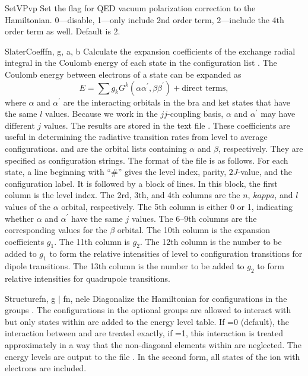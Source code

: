 \begin{fundesc}{SetVP}{vp}
Set the flag for QED vacuum polarization correction to the Hamiltonian.
0---disable, 1---only include 2nd order term, 2---include the 4th order term as
well. Default is 2.
\end{fundesc}

\begin{fundesc}{SlaterCoeff}{fn, g, a, b}
Calculate the expansion coefficients of the exchange radial integral in the
Coulomb energy of each state in the configuration list  . The Coulomb
energy between electrons of a state can be expanded as
\begin{equation}
E = \sum g_kG^k(\alpha\alpha^\prime,\beta\beta^\prime) + \mbox{direct terms},
\end{equation}
where $\alpha$ and $\alpha^\prime$ are the interacting orbitals in the bra and
ket states that have the same $l$ values. Because we work in the $jj$-coupling
basis, $\alpha$ and $\alpha^\prime$ may have different $j$ values. The results
are stored in the text file . These coefficients are useful in
determining the radiative transition rates from level to average configurations.
 and  are the orbital lists containing $\alpha$ and $\beta$,
respectively. They are specified as configuration strings. The format of the
file is as follows. For each state, a line beginning with ``\#'' gives the level
index, parity, $2J$-value, and the configuration label. It is followed by a
block of lines. In this block, the first column is the level index. The 2rd,
3th, and 4th columns are the $n$, $kappa$, and $l$ values of the $\alpha$
orbital, respectively. The 5th column is either 0 or 1, indicating whether
$\alpha$ and $\alpha^\prime$ have the same $j$ values. The 6--9th  columns are
the corresponding values for the $\beta$ orbital. The 10th column is the
expansion coefficients $g_1$. The 11th column is $g_2$. The 12th column is the
number to be added to $g_1$ to form the relative intensities of level to
configuration transitions for dipole transitions. The 13th column is the number
to be added to $g_2$ to form relative intensities for quadrupole transitions.
\end{fundesc}

\begin{fundesc}{Structure}{fn, g $\mid$ fn, nele}
Diagonalize the Hamiltonian for configurations in the groups . The
configurations in the optional groups  are allowed to interact with
 but only states within  are added to the energy level table. If
=0 (default), the interaction between  and  are treated
exactly, if =1, this interaction is treated approximately in a way that
the non-diagonal elements within  are neglected. The energy levels are
output to the file . In the second form, all states of the ion with
 electrons are included.
\end{fundesc}

